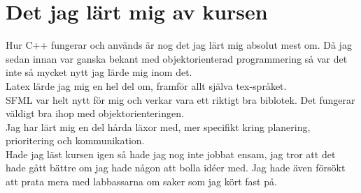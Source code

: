 \documentclass{TDP005mall}
\begin{document}
\section{Det jag lärt mig av kursen}
Hur C++ fungerar och används är nog det jag lärt mig absolut mest om. Då jag sedan innan var ganska 
bekant med objektorienterad programmering så var det inte så mycket nytt jag lärde mig inom det. \\
Latex lärde jag mig en hel del om, framför allt själva tex-språket. \\
SFML var helt nytt för mig och verkar vara ett riktigt bra biblotek. Det fungerar väldigt bra ihop 
med objektorienteringen. \\
Jag har lärt mig en del hårda läxor med, mer specifikt kring planering, prioritering och kommunikation. \\
Hade jag läst kursen igen så hade jag nog inte jobbat ensam, jag tror att det hade gått bättre om 
jag hade någon att bolla idéer med. Jag hade även försökt att prata mera med labbassarna om saker 
som jag kört fast på. 
\end{document}
